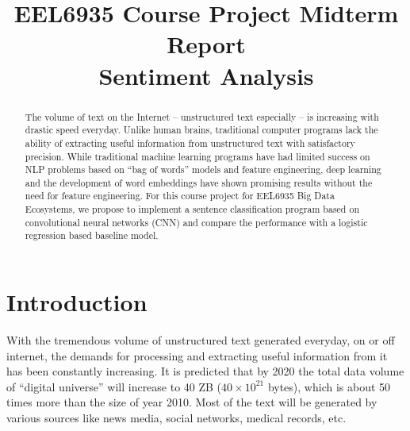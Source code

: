 \documentclass[conference]{IEEEtran}
\begin{document}
\renewcommand{\figureautorefname}{Fig.}
\newcommand{\subfigureautorefname}{Fig.}
\renewcommand{\sectionautorefname}{Section}
\renewcommand{\subsectionautorefname}{Section}

\title{EEL6935 Course Project Midterm Report \\
    Sentiment Analysis}
\author{
}

\maketitle

\begin{abstract}
    The volume of text on the Internet -- unstructured text especially --
    is increasing with drastic speed everyday. Unlike
    human brains, traditional computer programs lack the ability of extracting
    useful information from unstructured text with satisfactory precision.
    While traditional machine learning programs have had limited success
    on NLP problems based on ``bag of words'' models and feature engineering,
    deep learning and the development of word embeddings have shown
    promising results without the need for feature engineering. For this course
    project for EEL6935 Big Data Ecosystems, we propose to implement a sentence 
    classification program based on convolutional neural networks (CNN) and 
    compare the performance with a logistic regression based baseline model.
    
\end{abstract}

\IEEEpeerreviewmaketitle

\section{Introduction}
\label{intro}
    With the tremendous volume of unstructured text generated everyday, on or off
    internet, the demands for processing and extracting useful information
    from it has been constantly increasing. It is predicted that by 2020 the
    total data volume of ``digital universe'' will increase to 40 ZB
    ($40\times 10^{21}$ bytes), which is about 50 times more than the size of
    year 2010\cite{gantz2012digital}. Most of the text will be generated by various
    sources like news media, social networks, medical records, etc.
\end{document}

